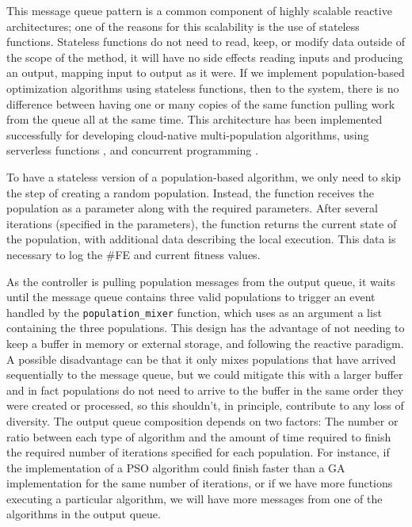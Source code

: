 \documentclass[runningheads]{llncs}
\begin{document}
This message queue pattern is a common component of highly
scalable reactive architectures; one of the reasons for this
scalability is the use of stateless functions. Stateless
functions do not need to read, keep, or modify data outside of the
scope of the method, it will have no side effects reading inputs and
producing an output, mapping input to output as it were. If we
implement population-based optimization algorithms using stateless
functions, then to the system, there is no difference between having
one or many copies of the same function pulling work from the queue
all at the same time. This architecture has been implemented successfully for
developing cloud-native multi-population algorithms, using serverless
functions \cite{garcia2018modern}, and concurrent programming
\cite{guervos2019improving}.

To have a stateless version of a population-based algorithm, we only need to
skip the step of creating a random population. Instead, the function receives
the population as a parameter along with the required parameters. After several
iterations (specified in the parameters), the function returns the current state
of the population, with additional data describing the local execution. This
data is necessary to log the \#FE and current fitness values.

As the controller is pulling population messages from the output
queue, it waits until the message queue contains three valid
populations to trigger an event handled by the
\texttt{population\_mixer} function, which uses as an argument a list
containing the three populations. This design has the advantage of not
needing to keep a buffer in memory or external storage, and following
the reactive paradigm. A possible disadvantage can be that it only
mixes populations that have arrived sequentially to the message queue,
but we could mitigate this with a larger buffer and in fact
populations do not need to arrive to the buffer in the same order they
were created or processed, so this shouldn't, in principle, contribute
to any loss of diversity. The output queue composition depends on two factors:
The number or ratio between each type of algorithm and
the amount of time required to finish the required
number of iterations specified for each population.
For instance, if the implementation of a PSO algorithm
could finish faster than a GA implementation for the
same number of iterations, or if we have more
functions executing a particular algorithm, we will
have more messages from one of the algorithms in the
output queue.
\end{document}
